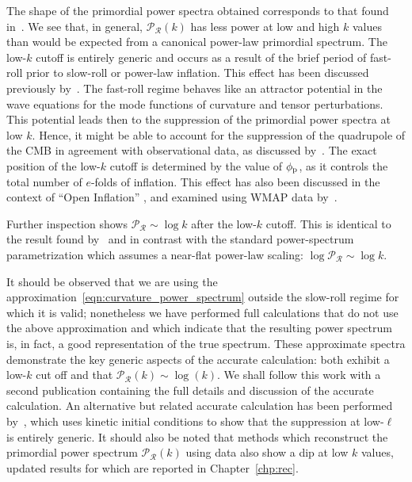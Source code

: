 The shape of the primordial power spectra obtained corresponds to that found in~\cite{lasenby_closed_2003}. We see that, in general, \(\mathcal{P}_\mathcal{R}(k)\) has less power at low and high \(k\) values than would be expected from a canonical power-law primordial spectrum.  The low-\(k\) cutoff is entirely generic and occurs as a result of the brief period of fast-roll prior to slow-roll or power-law inflation.  This effect has been discussed previously by~\cite{boyanovsky_cmb_2006}. The fast-roll regime behaves like an attractor potential in the wave equations for the mode functions of curvature and tensor perturbations. This potential leads then to the suppression of the primordial power spectra at low \(k\).  Hence, it might be able to account for the suppression of the quadrupole of the CMB in agreement with observational data, as discussed by~\cite{boyanovsky_cmb_2006-1}.  The exact position of the low-\(k\) cutoff is determined by the value of \(\phi_{\mathrm{p}}\), as it controls the total number of \(e\)-folds of inflation. This effect has also been discussed in the context of ``Open Inflation'' \citep{Yamauchi_strings_2011,Linde_open_1999,Linde_toy_1999}, and examined using WMAP data by~\cite{Contaldi_suppress_2003}.

Further inspection shows \(\mathcal{P}_\mathcal{R} \sim \log k\) after the low-\(k\) cutoff. This is identical to the result found by~\cite{lasenby_closed_2003} and in contrast with the standard power-spectrum parametrization which assumes a near-flat power-law scaling: \(\log\mathcal{P}_\mathcal{R}\sim \log k\). 

 
It should be observed that we are using the approximation~\eqref{eqn:curvature_power_spectrum} outside the slow-roll regime for which it is valid; nonetheless we have performed full calculations that do not use the above approximation and which indicate that the resulting power spectrum is, in fact, a good representation of the true spectrum. These approximate spectra demonstrate the key generic aspects of the accurate calculation: both exhibit a low-\(k\) cut off and that \(\mathcal{P}_\mathcal{R}(k) \sim \log(k)\).  We shall follow this work with a second publication containing the full details and discussion of the accurate calculation. An alternative but related accurate calculation has been performed by~\cite{Lello_tensor_2013}, which uses kinetic initial conditions to show that the suppression at low-\(\ell\) is entirely generic. It should also be noted that methods which reconstruct the primordial power spectrum \(\mathcal{P}_\mathcal{R}(k)\) \citep{vazquez_reconstruction,Hazra_reconstruction_2013} using data also show a dip at low \(k\) values, updated results for which are reported in Chapter~\ref{chp:rec}.


